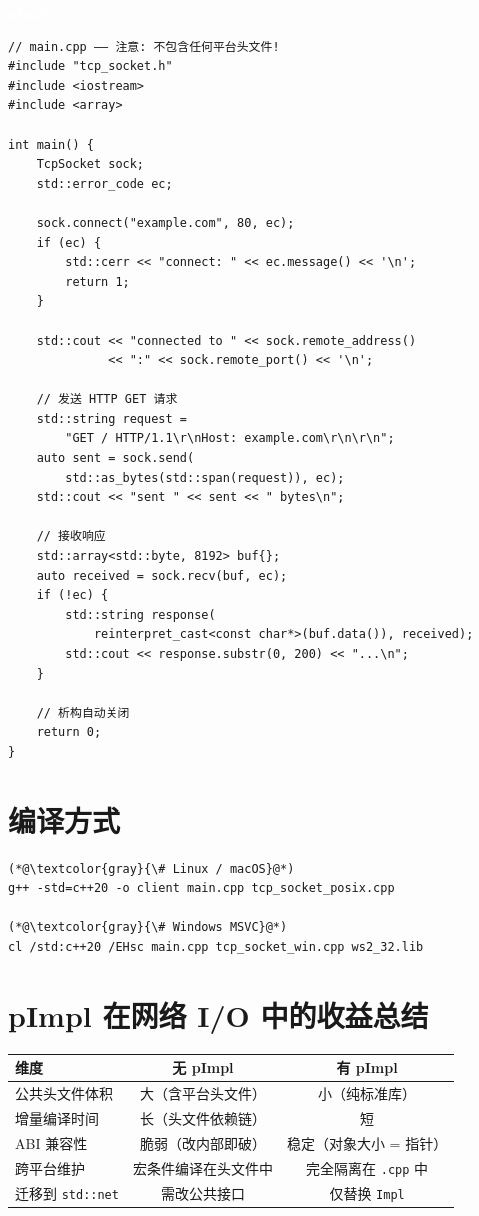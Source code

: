 \documentclass[12pt,a4paper,fontset=fandol]{ctexbook}
\newcommand{\Tp}[1]{\texttt{#1}}
\newcommand{\pimplabel}{%
  \noindent\begin{tcolorbox}[sharp corners,colback=pimplheadbg,colframe=pimplheadbg,
    left=6pt,right=6pt,top=2pt,bottom=2pt,boxrule=0pt]
  \textcolor{white}{\small\bfseries\sffamily pImpl}\end{tcolorbox}%
}
\begin{document}
\pimplabel
\begin{lstlisting}
// main.cpp —— 注意: 不包含任何平台头文件!
#include "tcp_socket.h"
#include <iostream>
#include <array>

int main() {
    TcpSocket sock;
    std::error_code ec;

    sock.connect("example.com", 80, ec);
    if (ec) {
        std::cerr << "connect: " << ec.message() << '\n';
        return 1;
    }

    std::cout << "connected to " << sock.remote_address()
              << ":" << sock.remote_port() << '\n';

    // 发送 HTTP GET 请求
    std::string request =
        "GET / HTTP/1.1\r\nHost: example.com\r\n\r\n";
    auto sent = sock.send(
        std::as_bytes(std::span(request)), ec);
    std::cout << "sent " << sent << " bytes\n";

    // 接收响应
    std::array<std::byte, 8192> buf{};
    auto received = sock.recv(buf, ec);
    if (!ec) {
        std::string response(
            reinterpret_cast<const char*>(buf.data()), received);
        std::cout << response.substr(0, 200) << "...\n";
    }

    // 析构自动关闭
    return 0;
}
\end{lstlisting}

\section{编译方式}

\begin{lstlisting}
(*@\textcolor{gray}{\# Linux / macOS}@*)
g++ -std=c++20 -o client main.cpp tcp_socket_posix.cpp

(*@\textcolor{gray}{\# Windows MSVC}@*)
cl /std:c++20 /EHsc main.cpp tcp_socket_win.cpp ws2_32.lib
\end{lstlisting}

\section{pImpl 在网络 I/O 中的收益总结}

\begin{compare}[title=有无 pImpl 的网络类对比]
\begin{tabular}{lcc}
\toprule
\textbf{维度} & \textbf{无 pImpl} & \textbf{有 pImpl} \\
\midrule
公共头文件体积 & 大（含平台头文件） & 小（纯标准库） \\
增量编译时间 & 长（头文件依赖链） & 短 \\
ABI 兼容性 & 脆弱（改内部即破） & 稳定（对象大小 = 指针） \\
跨平台维护 & 宏条件编译在头文件中 & 完全隔离在 \Tp{.cpp} 中 \\
迁移到 \Tp{std::net} & 需改公共接口 & 仅替换 \Tp{Impl} \\
\bottomrule
\end{tabular}
\end{compare}
\end{document}
